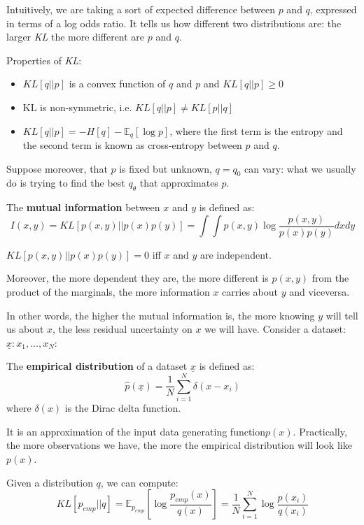 Intuitively, we are taking a sort of expected difference between $p$ and $q$, expressed in terms of a log odds ratio. It tells us how different two distributions are: the larger \textit{KL} the more different are $p$ and $q$.

Properties of \textit{KL}:
\begin{itemize}
    \item $KL[q||p]$ is a convex function of $q$ and $p$ and $KL[q||p] \ge 0$
    \item KL is non-symmetric, i.e. $KL[q||p] \neq KL[p||q]$
    \item $KL[q||p] = -H[q] - \mathbb{E}_q[\log p]$, where the first term is the entropy and the second term is known as cross-entropy between $p$ and $q$.
\end{itemize}


Suppose moreover, that $p$ is fixed but unknown, $q = q_0$ can vary: what we usually do is trying to find the best $q_{\theta}$ that approximates $p$.

The \textbf{mutual information} between $x$ and $y$ is defined as:
$$
I(x,y) = KL[p(x,y)||p(x)p(y)] = \int \int p(x,y) \log \dfrac{p(x,y)}{p(x)p(y)} dx dy
$$

$KL[p(x,y)||p(x)p(y)] = 0$ iff $x$ and $y$ are independent.

Moreover, the more dependent they are, the more different is $p(x,y)$ from the product of the marginals, the more information $x$ carries about $y$ and viceversa.

In other words, the higher the mutual information is, the more knowing $y$ will tell us about $x$, the less residual uncertainty on $x$ we will have.
\newpage
Consider a dataset: $\underline{x} : x_1,\dots,x_N$:
\begin{definitionblock}
    The \textbf{empirical distribution} of a dataset $\underline{x}$ is defined as:
    $$
    \hat p(\underline{x}) = \dfrac 1N \sum_{i=1}^N \delta(x - x_i)
    $$
    where $\delta(x)$ is the Dirac delta function.
\end{definitionblock}

It is an approximation of the input data generating function$p(x)$. Practically, the more observations we have, the more the empirical distribution will look like $p(x)$.

Given a distribution $q$, we can compute:
$$
KL[p_{emp}||q] = \mathbb{E}_{p_{emp}}\left[\log \dfrac{p_{emp}(x)}{q(x)}\right] = \dfrac 1N \sum_{i=1}^N \log \dfrac{p(x_i)}{q(x_i)}
$$

